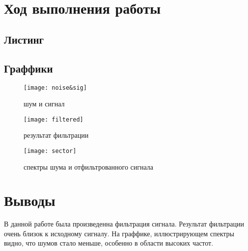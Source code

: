 \section{Ход выполнения работы}

\subsection{Листинг}


\parindent=1cm %

\subsection{Граффики}

\begin{figure}[H]
	\begin{center}
		\texttt{[image: noise\&sig]}
		\caption{шум и сигнал} 
		\label{pic:noise&sig} %
	\end{center}
\end{figure}

\begin{figure}[H]
	\begin{center}
		\texttt{[image: filtered]}
		\caption{результат фильтрации} 
		\label{pic:filtered} %
	\end{center}
\end{figure}

\begin{figure}[H]
	\begin{center}
		\texttt{[image: sector]}
		\caption{спектры шума и отфильтрованного сигнала} 
		\label{pic:sector} %
	\end{center}
\end{figure}


\section{Выводы}
В данной работе была произведенна фильтрация сигнала. Результат фильтрации очень близок к исходному сигналу. На граффике, иллюстрирующем спектры видно, что шумов стало меньше, особенно в области высоких частот. 

